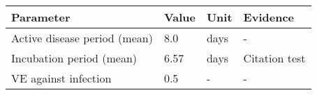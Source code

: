 \begin{tabular}{llll}
\toprule
                   Parameter & Value & Unit &                      Evidence \\
\midrule
Active disease period (mean) &   8.0 & days &                             - \\
    Incubation period (mean) &  6.57 & days & Citation test \cite{zou-2022} \\
        VE against infection &   0.5 &    - &                             - \\
\bottomrule
\end{tabular}
